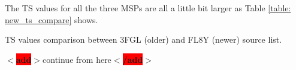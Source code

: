 \documentclass[12pt]{report}
\newcommand{\mycaption}[1]{\protect \caption{#1}}
\newcommand{\add}[1]{
  $<$\colorbox{red}{\textbf{add}}$>$#1$<$\colorbox{red}{\textbf{/add}}$>$
}
\begin{document}
      The TS values for all the three MSPs are all a little bit larger as Table 
      \ref{table: new_ts_compare} shows. 
      \begin{table}[!htp]
        \centering
          \mycaption{TS values comparison between 3FGL (older) and FL8Y (newer) source list.}
          \label{table: new_ts_compare}        
      \end{table}  



      \add{continue from here}






          
\end{document}
